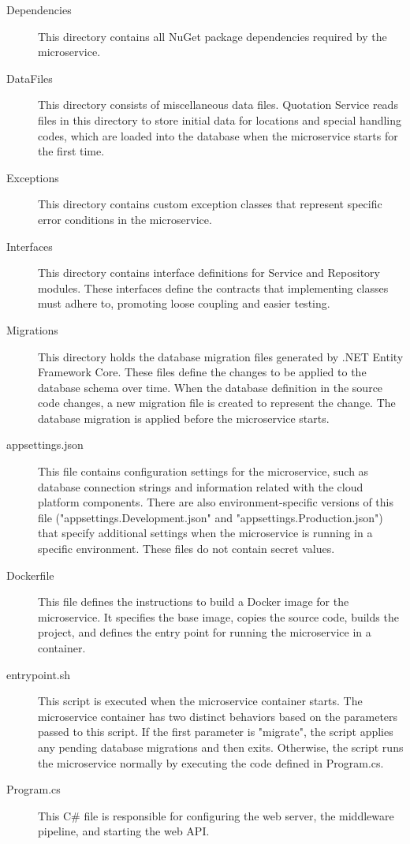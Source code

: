 \documentclass[12pt, reqno, oneside]{amsbook}
\theoremstyle{definition}
\theoremstyle{definition}
\numberwithin{section}{chapter}
\numberwithin{table}{chapter}
\numberwithin{figure}{chapter}
\begin{document}
\begin{description}
  \item[Dependencies] This directory contains all NuGet package dependencies required by the microservice.
  \item[DataFiles] This directory consists of miscellaneous data files. Quotation Service reads files in this directory to store initial data for locations and special handling codes, which are loaded into the database when the microservice starts for the first time.
  \item[Exceptions] This directory contains custom exception classes that represent specific error conditions in the microservice.
  \item[Interfaces] This directory contains interface definitions for Service and Repository modules. These interfaces define the contracts that implementing classes must adhere to, promoting loose coupling and easier testing.
  \item[Migrations] This directory holds the database migration files generated by .NET Entity Framework Core. These files define the changes to be applied to the database schema over time. When the database definition in the source code changes, a new migration file is created to represent the change. The database migration is applied before the microservice starts.
  \item[appsettings.json] This file contains configuration settings for the microservice, such as database connection strings and information related with the cloud platform components. There are also environment-specific versions of this file ("appsettings.Development.json" and "appsettings.Production.json") that specify additional settings when the microservice is running in a specific environment. These files do not contain secret values.
  \item[Dockerfile] This file defines the instructions to build a Docker image for the microservice. It specifies the base image, copies the source code, builds the project, and defines the entry point for running the microservice in a container.
  \item[entrypoint.sh] This script is executed when the microservice container starts. The microservice container has two distinct behaviors based on the parameters passed to this script. If the first parameter is "migrate", the script applies any pending database migrations and then exits. Otherwise, the script runs the microservice normally by executing the code defined in Program.cs.
  \item[Program.cs] This C\# file is responsible for configuring the web server, the middleware pipeline, and starting the web \ac{API}.
\end{description}
\end{document}

